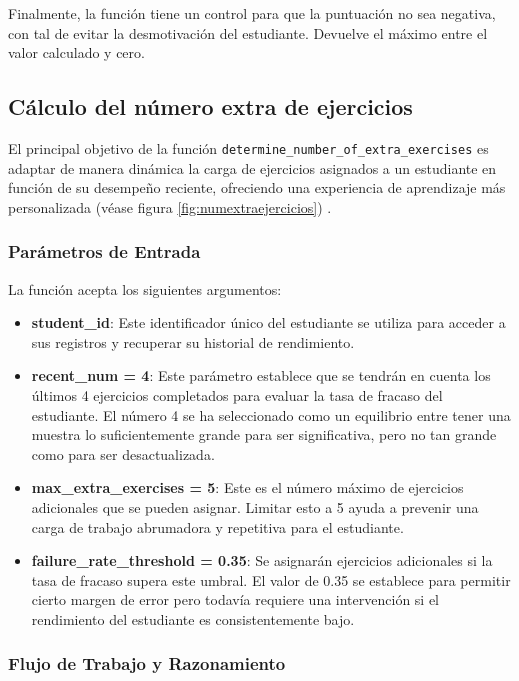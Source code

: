 Finalmente, la función tiene un control para que la puntuación no sea negativa, con tal de evitar la desmotivación del estudiante. Devuelve el máximo entre el valor calculado y cero.

\subsection{Cálculo del número extra de ejercicios}

El principal objetivo de la función \texttt{determine\_number\_of\_extra\_exercises} es adaptar de manera dinámica la carga de ejercicios asignados a un estudiante en función de su desempeño reciente, ofreciendo una experiencia de aprendizaje más personalizada (véase figura \ref{fig:numextraejercicios}) .

\subsubsection{Parámetros de Entrada}

La función acepta los siguientes argumentos:

\begin{itemize}
    \item \textbf{student\_id}: Este identificador único del estudiante se utiliza para acceder a sus registros y recuperar su historial de rendimiento.
    \item \textbf{recent\_num = 4}: Este parámetro establece que se tendrán en cuenta los últimos 4 ejercicios completados para evaluar la tasa de fracaso del estudiante. El número 4 se ha seleccionado como un equilibrio entre tener una muestra lo suficientemente grande para ser significativa, pero no tan grande como para ser desactualizada.
    \item \textbf{max\_extra\_exercises = 5}: Este es el número máximo de ejercicios adicionales que se pueden asignar. Limitar esto a 5 ayuda a prevenir una carga de trabajo abrumadora y repetitiva para el estudiante.
    \item \textbf{failure\_rate\_threshold = 0.35}: Se asignarán ejercicios adicionales si la tasa de fracaso supera este umbral. El valor de 0.35 se establece para permitir cierto margen de error pero todavía requiere una intervención si el rendimiento del estudiante es consistentemente bajo.
\end{itemize}

\subsubsection{Flujo de Trabajo y Razonamiento}

